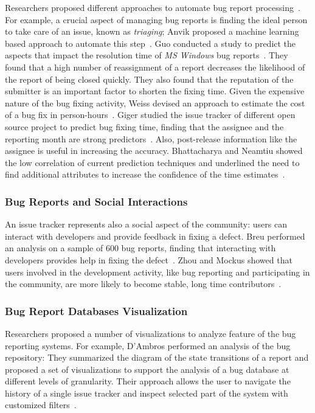 Researchers proposed different approaches to automate bug report processing~\cite{Weim2006}.
For example, a crucial aspect of managing bug reports is finding the ideal person to take care of an issue, known as {\em triaging}; Anvik \etal proposed a machine learning based approach to automate this step~\cite{Anvi2006a}.
Guo \etal conducted a study to predict the aspects that impact the resolution time of \textit{MS Windows} bug reports~\cite{Guo2010}.
They found that a high number of reassignment of a report decreases the likelihood of the report of being closed quickly.
They also found that the reputation of the submitter is an important factor to shorten the fixing time.
Given the expensive nature of the bug fixing activity, Weiss \etal devised an approach to estimate the cost of a bug fix in person-hours~\cite{Weis2007a}.
Giger \etal studied the issue tracker of different open source project to predict bug fixing time, finding that the assignee and the reporting month are strong predictors~\cite{Gige2010}.
Also, post-release information like the assignee is useful in increasing the accuracy.
Bhattacharya and Neamtiu showed the low correlation of current prediction techniques and underlined the need to find additional attributes to increase the confidence of the time estimates~\cite{Bhat2011}.


\subsubsection{Bug Reports and Social Interactions}

An issue tracker represents also a social aspect of the community: users can interact with developers and provide feedback in fixing a defect.
Breu \etal performed an analysis on a sample of 600 bug reports, finding that interacting with developers provides help in fixing the defect~\cite{Breu2010}.
Zhou and Mockus showed that users involved in the development activity, like bug reporting and participating in the community, are more likely to become stable, long time contributors~\cite{Zhou2015}.


\subsubsection{Bug Report Databases Visualization}

Researchers proposed a number of visualizations to analyze feature of the bug reporting systems.
For example, D'Ambros \etal performed an analysis of the \bzilla bug repository: They summarized the diagram of the state transitions of a report and proposed a set of visualizations to support the analysis of a bug database at different levels of granularity.
Their approach allows the user to navigate the history of a single issue tracker and inspect selected part of the system with customized filters~\cite{DAmb2007b}.



